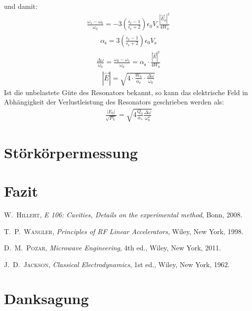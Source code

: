 \documentclass[11pt, a4paper]{scrbook}
\newcommand{\ve}{\vec{E}}
\begin{document}
	und damit:
	\begin{align}
		\frac{\omega_1 - \omega_0}{\omega_0} = - 3 \left( \frac{\epsilon_\mathrm{r} - 1}{\epsilon_\mathrm{r} + 2} \right) \epsilon_0 V_\mathrm{s} \frac{|\ve_0|^2}{4 W_0}
	\end{align}
	\begin{align}
		\alpha_\mathrm{s} = 3 \left( \frac{\epsilon_\mathrm{r} - 1}{\epsilon_\mathrm{r} + 2} \right) \epsilon_0 V_\mathrm{s}
	\end{align}
	\begin{align}
		\frac{\Delta \omega}{\omega_0} = \frac{\omega_0 - \omega_1}{\omega_0} = \alpha_\mathrm{s} \cdot \frac{|\ve|^2}{4 W_0}
	\end{align}
	\begin{align}
		|\ve| = \sqrt{4 \cdot \frac{W_0}{\alpha_\mathrm{s}} \cdot \frac{\Delta \omega}{\omega_0}}
	\end{align}
	Ist die unbelastete Güte des Resonators bekannt, so kann das elektrische Feld in Abhängigkeit der Verlustleistung des Resonators geschrieben werden als:
	\begin{align}
		\frac{|E_0|}{\sqrt{P_\mathrm{V}}} = \sqrt{4 \frac{Q_0}{\alpha_s} \frac{\Delta \omega}{\omega_0^2}}
	\end{align}
	
	
	\chapter{Störkörpermessung}
	
	\chapter{Fazit}
	
	\backmatter
		
	\begin{thebibliography}{19}
		\textsc{W.\ Hillert},
		\emph{E 106: Cavities, Details on the experimental method}, Bonn, 2008.

		\textsc{T.\ P.\ Wangler},
		\emph{Principles of RF Linear Accelerators},
		Wiley, New York, 1998.
	
		\textsc{D.\ M.\ Pozar},
		\emph{Microwave Engineering}, 4th ed.,
		Wiley, New York, 2011.
	
		\textsc{J.\ D.\ Jackson},
		\emph{Classical Electrodynamics}, 1st ed.,
		Wiley, New York, 1962.
	
	\end{thebibliography}
	
	\chapter{Danksagung}
	
	\listoffigures
	\listoftables
	
\end{document}

